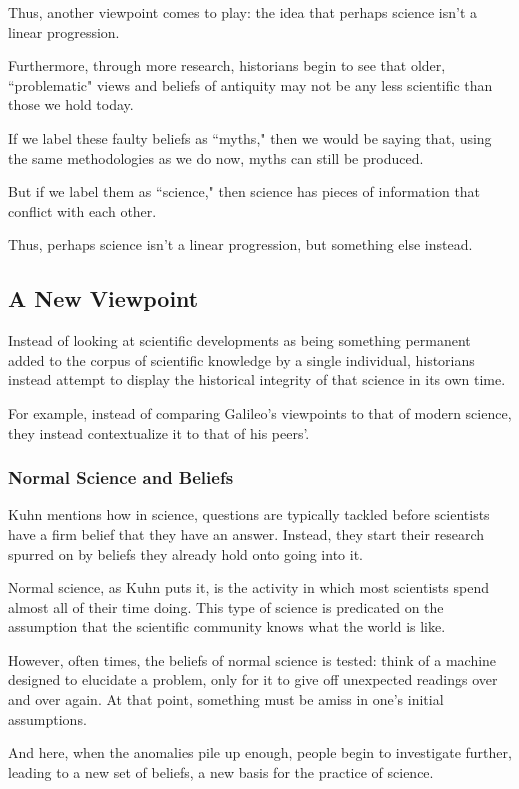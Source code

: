 \documentclass[openany]{book}
\begin{document}
Thus, another viewpoint comes to play: the idea that perhaps science isn't a linear progression.

Furthermore, through more research, historians begin to see that older, ``problematic" views and beliefs of antiquity may not be any less scientific than those we hold today.

If we label these faulty beliefs as ``myths," then we would be saying that, using the same methodologies as we do now, myths can still be produced.

But if we label them as ``science," then science has pieces of information that conflict with each other. 

Thus, perhaps science isn't a linear progression, but something else instead.

\subsection{A New Viewpoint}
Instead of looking at scientific developments as being something permanent added to the corpus of scientific knowledge by a single individual, historians instead attempt to display the historical integrity of that science in its own time.

\begin{example}
	For example, instead of comparing Galileo's viewpoints to that of modern science, they instead contextualize it to that of his peers'.
\end{example}

\subsubsection{Normal Science and Beliefs}
Kuhn mentions how in science, questions are typically tackled before scientists have a firm belief that they have an answer. Instead, they start their research spurred on by beliefs they already hold onto going into it.

Normal science, as Kuhn puts it, is the activity in which most scientists spend almost all of their time doing. This type of science is predicated on the assumption that the scientific community knows what the world is like.

However, often times, the beliefs of normal science is tested: think of a machine designed to elucidate a problem, only for it to give off unexpected readings over and over again. At that point, something must be amiss in one's initial assumptions.

And here, when the anomalies pile up enough, people begin to investigate further, leading to a new set of beliefs, a new basis for the practice of science.
\end{document}
